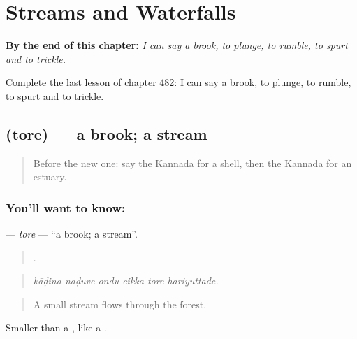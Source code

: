 
\chapter{Streams and Waterfalls}
\label{ch:ka-streams-and-waterfalls}

\begin{chapteropening}
\textbf{By the end of this chapter:} \emph{I can say a brook, to plunge, to rumble, to spurt and to trickle.}

Complete the last lesson of chapter 482: I can say a brook, to plunge, to rumble, to spurt and to trickle.
\end{chapteropening}

\section[\texorpdfstring{\kn{ತೊರೆ} (tore)}{ತೊರೆ (tore)}]{ (tore) — a brook; a stream}

\label{lesson:KA-C482-tore}



\begin{quote}
Before the new one: say the Kannada for a shell, then the Kannada for an estuary.
\end{quote}

\subsection*{You'll want to know: }
\textbf{} — \emph{tore} — \textquotedblleft{}a brook; a stream\textquotedblright{}.

\begin{quote}
     .
\end{quote}

\begin{quote}
\emph{kāḍina naḍuve ondu cikka tore hariyuttade.}
\end{quote}

\begin{quote}
A small stream flows through the forest.
\end{quote}

Smaller than a , like a .

